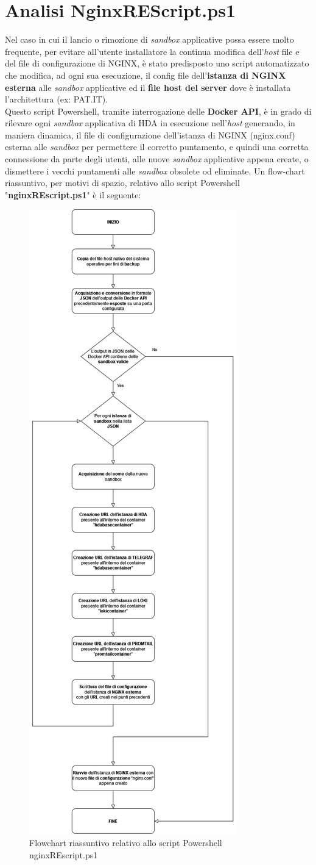 \section{Analisi NginxREScript.ps1}
Nel caso in cui il lancio o rimozione di \textit{sandbox} applicative possa essere molto frequente, per evitare all'utente installatore la continua modifica dell'\textit{host} file e del file di configurazione di NGINX, è stato predisposto uno script automatizzato che modifica, ad ogni sua esecuzione, il config file dell'\textbf{istanza di NGINX esterna} alle \textit{sandbox} applicative ed il \textbf{file host del server} dove è installata l'architettura (ex: PAT.IT).\\
Questo script Powershell, tramite interrogazione delle \textbf{Docker API}, è in grado di rilevare ogni \textit{sandbox} applicativa di HDA in esecuzione nell'\textit{host} generando, in maniera dinamica, il file di configurazione dell'istanza di NGINX (nginx.conf) esterna alle \textit{sandbox} per permettere il corretto puntamento, e quindi una corretta connessione da parte degli utenti, alle nuove \textit{sandbox} applicative appena create, o dismettere i vecchi puntamenti alle \textit{sandbox} obsolete od eliminate. 
Un flow-chart riassuntivo, per motivi di spazio, relativo allo script Powershell "\textbf{nginxREscript.ps1}" è il seguente:
\begin{figure}[!h]     
\centering 
    \includegraphics[width=0.45\columnwidth]{immagini/flowchart/flowchart_nginxREscript} 
    \caption{Flowchart riassuntivo relativo allo script Powershell nginxREscript.ps1}
\end{figure}\\









